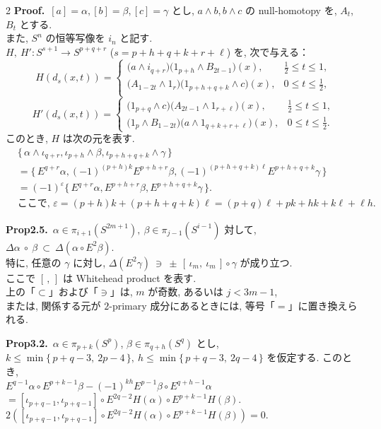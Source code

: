 \documentclass[10pt, leqno]{ltjsarticle}
\newcommand{\toda}[1]{\{\,#1\,\}}              %
\numberwithin{equation}{section}
\theoremstyle{plain}
\theoremstyle{definition}
\theoremstyle{remark}
\begin{document}
\begin{paracol}{2}
\noindent
\textbf{Proof.}\ 
$[a]=\alpha,[b]=\beta,[c]=\gamma$ とし, 
$a \wedge b, b \wedge c$ の null-homotopy を,
$A_t$, $B_t$ とする. \\
また, $S^n$ の恒等写像を $i_n$ と記す. \\
$H,\ H':S^{s+1}\to S^{p+q+r}$ ($s=p+h+q+k+r+\ell$) を, 次で与える：
\[
H(d_s(x,t))=
\begin{cases}
\bigl(a \wedge i_{q+r}\bigr)\bigl(1_{p+h} \wedge B_{2t-1}\bigr)(x), & \tfrac12\le t\le1,\\[2pt]
\bigl(A_{1-2t} \wedge 1_r\bigr)\bigl(1_{p+h+q+k} \wedge c\bigr)(x), & 0\le t\le\tfrac12,\\[2pt]
\end{cases}
\]
\[
H'(d_s(x,t))=
\begin{cases}
\bigl(1_{p+q} \wedge c\bigr)\bigl(A_{2t-1} \wedge 1_{r+\ell}\bigr)(x), & \tfrac12\le t\le1,\\[2pt]
\bigl(1_p \wedge B_{1-2t}\bigr)\bigl(a \wedge 1_{q+k+r+\ell}\bigr)(x), & 0\le t\le\tfrac12.
\end{cases}
\]
このとき, $H$ は次の元を表す. 
\[
\begin{align*}
& \toda{\alpha \wedge \iota_{q+r},
\iota_{p+h} \wedge \beta, 
\iota_{p+h+q+k} \wedge \gamma}\\
& = \toda{E^{q+r}\alpha, 
(-1)^{(p+h)k}E^{p+h+r}\beta, 
(-1)^{(p+h+q+k)\ell}E^{p+h+q+k}\gamma}\\
& =(-1)^\varepsilon\toda{E^{q+r}\alpha, 
E^{p+h+r}\beta, 
E^{p+h+q+k}\gamma}.\\
& \text{ここで, } \varepsilon = 
(p+h)k + (p+h+q+k)\ell = 
(p+q)\ell + pk + hk + k\ell + \ell h .
\end{align*}
\]

\switchcolumn

\noindent
\textbf{Prop2.5.}\
$\alpha\in\pi_{i+1}(S^{2m+1}), \ \beta\in \pi_{j-1}(S^{i-1})$ 対して, 
\(
\Delta\alpha\ \circ\ \beta\ \subset\ \Delta(\alpha\circ E^2\beta).
\)\\
特に, 任意の $\gamma$ に対し,
\(
\Delta(E^2\gamma)\ \ni\ \pm\,[\,\iota_m,\ \iota_m\,]\circ\gamma
\)
が成り立つ. \\
ここで $[\, ,\,]$ は Whitehead product を表す. \\
上の「$\subset$」および「$\ni$」は, $m$ が奇数, 
あるいは $j<3m-1$, \\
または, 関係する元が \(2\)-primary 成分にあるときには, 
等号「$=$」に置き換えられる. 

\noindent
\textbf{Prop3.2.}\
$\alpha\in\pi_{p+k}(S^p)$, $\beta\in\pi_{q+h}(S^q)$ とし, \\
\(k\le \min\{\,p+q-3,\ 2p-4\,\},\
h\le \min\{\,p+q-3,\ 2q-4\,\}\)
を仮定する. このとき,\\
\(
E^{q-1}\alpha \circ E^{p+k-1}\beta
 - (-1)^{kh}E^{p-1}\beta\circ E^{q+h-1}\alpha 
\)\\
\(
= [\iota_{p+q-1}, \iota_{p+q-1}]\circ 
E^{2q-2}H(\alpha)\circ E^{p+k-1}H(\beta) .
\)\\
\(
2([\iota_{p+q-1}, \iota_{p+q-1}]\circ 
E^{2q-2}H(\alpha)\circ E^{p+k-1}H(\beta)) = 0.
\)


\end{paracol}
\end{document}
